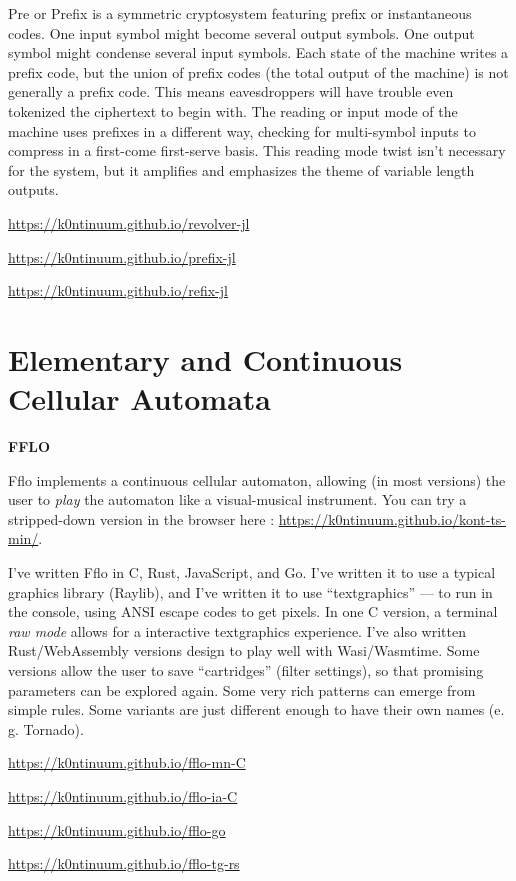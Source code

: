 \documentclass{article}
\renewcommand{\i}{\textit}
\renewcommand{\b}{\textbf}
\newcommand{\q}{\enquote}
\begin{document}
{{Pre or Prefix is a symmetric cryptosystem featuring prefix or instantaneous codes. One input symbol might become several output symbols. One output symbol might condense several input symbols. Each state of the machine writes a prefix code, but the union of prefix codes (the total output of the machine) is not generally a prefix code. This means eavesdroppers will have trouble even tokenized the ciphertext to begin with. The reading or input mode of the machine uses prefixes in a different way, checking for multi-symbol inputs to compress in a first-come first-serve basis. This reading mode twist isn't necessary for the system, but it amplifies and emphasizes the theme of variable length outputs.  

\url{https://k0ntinuum.github.io/revolver-jl}

\url{https://k0ntinuum.github.io/prefix-jl}

\url{https://k0ntinuum.github.io/refix-jl}

\section*{Elementary and Continuous Cellular Automata}
  
\b{FFLO}

Fflo implements a continuous cellular automaton, allowing (in most versions) the user to \i{play} the automaton like a visual-musical instrument. You can try a stripped-down version in the browser here : \url{https://k0ntinuum.github.io/kont-ts-min/}.  

I've written Fflo  in C, Rust, JavaScript, and Go. I've written it to use a typical graphics library (Raylib), and I've written it to use \q{textgraphics} --- to run in the console, using ANSI escape codes to get pixels. In one C version, a terminal \i{raw mode} allows for a interactive textgraphics experience. I've also written Rust/WebAssembly versions design to play well with Wasi/Wasmtime. Some versions allow the user to save \q{cartridges} (filter settings), so that promising parameters can be explored again. Some very rich patterns can emerge from simple rules. Some variants are just different enough to have their own names (e. g. Tornado).

\url{https://k0ntinuum.github.io/fflo-mn-C}

\url{https://k0ntinuum.github.io/fflo-ia-C}

\url{https://k0ntinuum.github.io/fflo-go}

\url{https://k0ntinuum.github.io/fflo-tg-rs}

}}
\end{document}
